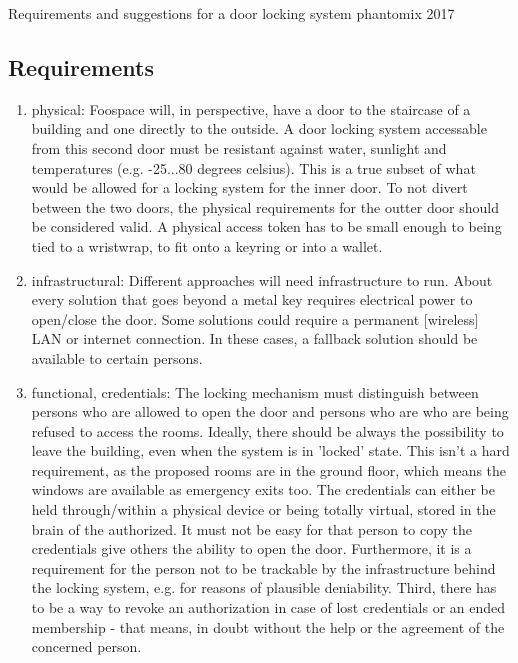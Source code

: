\documentclass[10pt,a4paper]{scrartcl}
\begin{document}
{\LARGE Requirements and suggestions for a door locking system}
phantomix 2017
\subsection*{Requirements}
\begin{enumerate}
    \item physical: Foospace will, in perspective, have a door to the staircase of a building and one directly to the outside. A door locking system accessable from this second door must be resistant against water, sunlight and temperatures (e.g. -25...80 degrees celsius). This is a true subset of what would be allowed for a locking system for the inner door. To not divert between the two doors, the physical requirements for the outter door should be considered valid.
A physical access token has to be small enough to being tied to a wristwrap, to fit onto a keyring or into a wallet.
    \item infrastructural: Different approaches will need infrastructure to run. About every solution that goes beyond a metal key requires electrical power to open/close the door. Some solutions could require a permanent [wireless] LAN or internet connection. In these cases, a fallback solution should be available to certain persons.
    \item functional, credentials: The locking mechanism must distinguish between persons who are allowed to open the door and persons who are who are being refused to access the rooms. Ideally, there should be always the possibility to leave the building, even when the system is in 'locked' state. This isn't a hard requirement, as the proposed rooms are in the ground floor, which means the windows are available as emergency exits too.
The credentials can either be held through/within a physical device or being totally virtual, stored in the brain of the authorized. It must not be easy for that person to copy the credentials give others the ability to open the door. Furthermore, it is a requirement for the person not to be trackable by the infrastructure behind the locking system, e.g. for reasons of plausible deniability. Third, there has to be a way to revoke an authorization in case of lost credentials or an ended membership - that means, in doubt without the help or the agreement of the concerned person.
\end{enumerate}
\end{document}
